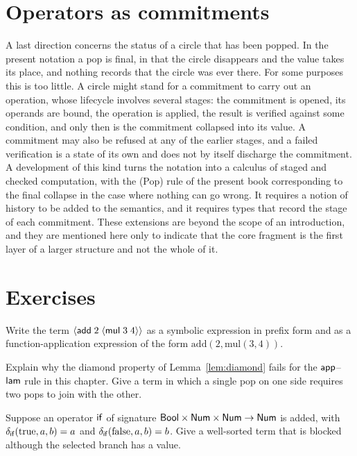 \section{Operators as commitments}

A last direction concerns the status of a circle that has been popped. In the present notation a pop is final, in that the circle disappears and the value takes its place, and nothing records that the circle was ever there. For some purposes this is too little. A circle might stand for a commitment to carry out an operation, whose lifecycle involves several stages: the commitment is opened, its operands are bound, the operation is applied, the result is verified against some condition, and only then is the commitment collapsed into its value. A commitment may also be refused at any of the earlier stages, and a failed verification is a state of its own and does not by itself discharge the commitment. A development of this kind turns the notation into a calculus of staged and checked computation, with the (Pop) rule of the present book corresponding to the final collapse in the case where nothing can go wrong. It requires a notion of history to be added to the semantics, and it requires types that record the stage of each commitment. These extensions are beyond the scope of an introduction, and they are mentioned here only to indicate that the core fragment is the first layer of a larger structure and not the whole of it.

\section*{Exercises}

\begin{exercise}
Write the term $\langle \mathsf{add}\; 2\; \langle \mathsf{mul}\; 3\; 4\rangle\rangle$ as a symbolic expression in prefix form and as a function-application expression of the form $\mathrm{add}(2,\mathrm{mul}(3,4))$.
\end{exercise}

\begin{exercise}
Explain why the diamond property of Lemma~\ref{lem:diamond} fails for the $\mathsf{app}$--$\mathsf{lam}$ rule in this chapter. Give a term in which a single pop on one side requires two pops to join with the other.
\end{exercise}

\begin{exercise}
Suppose an operator $\mathsf{if}$ of signature $\mathsf{Bool}\times\mathsf{Num}\times\mathsf{Num}\to\mathsf{Num}$ is added, with $\delta_{\mathsf{if}}(\mathrm{true},a,b)=a$ and $\delta_{\mathsf{if}}(\mathrm{false},a,b)=b$. Give a well-sorted term that is blocked although the selected branch has a value.
\end{exercise}
